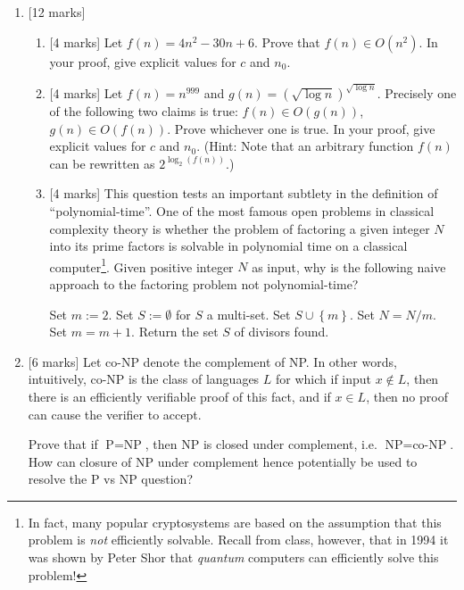 \documentclass{article}
\newcommand{\class}[1]{\text{#1}}
\newcommand{\set}[1]{{\left\{#1\right\}}}    %
\begin{document}
\begin{enumerate}
    \item {[12 marks]} \begin{enumerate}
        \item {[4 marks]} Let $f(n)=4n^2-30n+6$. Prove that $f(n)\in O(n^2)$. In your proof, give explicit values for $c$ and $n_0$.
        \item {[4 marks]} Let $f(n)=n^{999}$ and $g(n)=(\sqrt{\log n})^{\sqrt{\log n}}$. Precisely one of the following two claims is true: $f(n)\in O(g(n))$,  $g(n)\in O(f(n))$. Prove whichever one is true. In your proof, give explicit values for $c$ and $n_0$. (Hint: Note that an arbitrary function $f(n)$ can be rewritten as $2^{\log_2(f(n))}$.)
        \item {[4 marks]} This question tests an important subtlety in the definition of ``polynomial-time''.
             One of the most famous open problems in classical complexity theory is whether the problem of factoring a given integer $N$ into its prime factors is solvable in polynomial time on a classical computer\footnote{In fact, many popular cryptosystems are based on the assumption that this problem is \emph{not} efficiently solvable. Recall from class, however, that in 1994 it was shown by Peter Shor that \emph{quantum} computers can efficiently solve this problem!}. Given positive integer $N$ as input, why is the following naive approach to the factoring problem not polynomial-time?
                \begin{algorithmic}[1]
            \State Set $m := 2$.
            \State Set $S := \emptyset$ for $S$ a multi-set.
                    \State Set $S\cup \set{m}$.
                    \State Set $N=N/m$.
                \Else
                    \State Set $m=m+1$.
                \EndIf
            \EndWhile
            \State Return the set $S$ of divisors found.
\end{algorithmic}

    \end{enumerate}
    \item {[6 marks]} 
          Let co-NP denote the complement of NP. In other words, intuitively, co-NP is the class of languages $L$ for which if input $x\not\in L$, then there is an efficiently verifiable proof of this fact, and if $x\in L$, then no proof can cause the verifier to accept.
            
            Prove that if $\class{P}=\class{NP}$, then NP is closed under complement, i.e. $\class{NP}=\class{co-NP}$. How can closure of NP under complement hence potentially be used to resolve the P vs NP question?
    

\end{enumerate}
\end{document}
